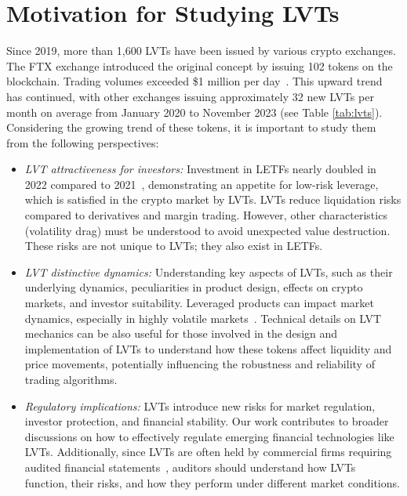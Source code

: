 \section{Motivation for Studying LVTs}
Since 2019, more than 1,600 LVTs have been issued by various crypto exchanges. The FTX exchange introduced the original concept by issuing 102 tokens on the blockchain. Trading volumes exceeded \$1 million per day~\cite{TradingVolume}. This upward trend has continued, with other exchanges issuing approximately 32 new LVTs per month on average from January 2020 to November 2023 (see Table \ref{tab:lvts}). Considering the growing trend of these tokens, it is important to study them from the following perspectives:

\begin{itemize}
	\item \textsl{LVT attractiveness for investors:} Investment in LETFs nearly doubled in 2022 compared to 2021~\cite{FT_LETF}, demonstrating an appetite for low-risk leverage, which is satisfied in the crypto market by LVTs. LVTs reduce liquidation risks compared to derivatives and margin trading. However, other characteristics (\eg volatility drag) must be understood to avoid unexpected value destruction. These risks are not unique to LVTs; they also exist in LETFs.
	
	\item \textsl{LVT distinctive dynamics:} Understanding key aspects of LVTs, such as their underlying dynamics, peculiarities in product design, effects on crypto markets, and investor suitability. Leveraged products can impact market dynamics, especially in highly volatile markets~\cite{shum2016intraday}. Technical details on LVT mechanics can be also useful for those involved in the design and implementation of LVTs to understand how these tokens affect liquidity and price movements, potentially influencing the robustness and reliability of trading algorithms.
	
	\item \textsl{Regulatory implications:} LVTs introduce new risks for market regulation, investor protection, and financial stability. Our work contributes to broader discussions on how to effectively regulate emerging financial technologies like LVTs. Additionally, since LVTs are often held by commercial firms requiring audited financial statements~\cite{devault2021blessing}, auditors should understand how LVTs function, their risks, and how they perform under different market conditions.
\end{itemize}

